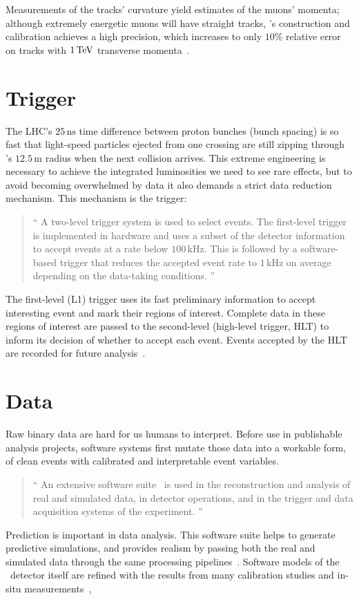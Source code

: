 Measurements of the tracks' curvature yield estimates of the muons' momenta;
although extremely energetic muons will have straight tracks,
\atlas's construction and calibration achieves a high precision, which
increases to only $10\%$ relative error on tracks with $1\,\eV[T]$ transverse
momenta~\cite{
atlas1994proposal,
atlas2008experiment,
ATL-PHYS-PUB-2015-037
}.


\section{Trigger}
\label{sec:atlas_trigger}
The LHC's $25\,\mathrm{ns}$ time difference between proton bunches
(bunch spacing) is so fast that light-speed particles ejected from one crossing
are still zipping through \atlas's $12.5\,\textrm{m}$ radius when the next
collision arrives.
This extreme engineering is necessary to achieve the integrated luminosities we
need to see rare effects, but to avoid becoming overwhelmed
by data it also demands a strict data reduction mechanism.
This mechanism is the trigger:
\begin{quote}
``%
A two-level trigger system is used to select events.
The first-level trigger is implemented in hardware and uses a subset of the
detector information to accept events at a rate below $100\,\mathrm{kHz}$.
This is followed by a software-based trigger that reduces the accepted event
rate to $1\,\mathrm{kHz}$ on average depending on the data-taking conditions.%
''~\cite{atlas2022searches}
\end{quote}
The first-level (L1) trigger uses its fast preliminary information to accept
interesting event and mark their regions of interest.
Complete data in these regions of interest are passed to the second-level
(high-level trigger, HLT) to inform its decision of whether to accept each
event.
Events accepted by the HLT are recorded for future analysis~\cite{
atlas2016trigger,
atlas2008experiment
}.


\section{Data}
\label{sec:atlas_data}
Raw binary data are hard for us humans to interpret.
Before use in publishable analysis projects, software systems first mutate
those data into a workable form, of clean events with calibrated and
interpretable event variables.
\begin{quote}
``%
An extensive software suite~\cite{ATL-SOFT-PUB-2021-001} is used in the
reconstruction and analysis of real and simulated data, in detector operations,
and in the trigger and data acquisition systems of the experiment.%
''~\cite{atlas2022searches}
\end{quote}
Prediction is important in data analysis.
This software suite helps to generate predictive simulations, and provides
realism by passing both the real and simulated data through the same processing
pipelines~\cite{SOFT-2010-01, geant2003}.
Software models of the \atlas\ detector itself are refined with the results from
many calibration studies and in-situ measurements~\cite{atlas2008experiment},

